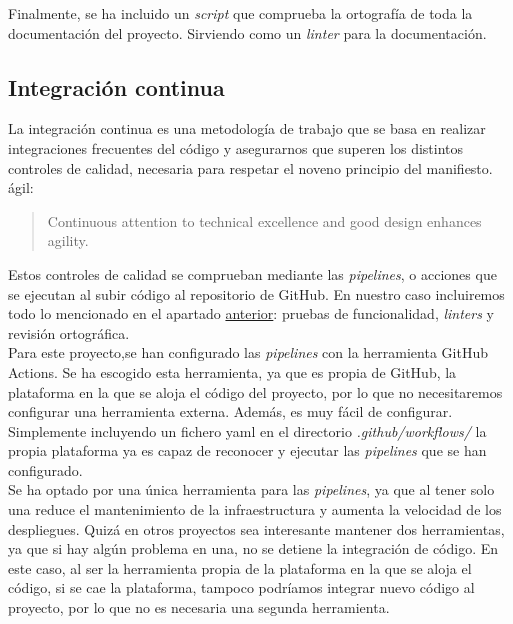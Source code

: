 Finalmente, se ha incluido un \textit{script} que comprueba la ortografía de toda la documentación del proyecto.
Sirviendo como un \textit{linter} para la documentación.\\

\subsection{Integración continua}

La integración continua es una metodología de trabajo que se basa en realizar integraciones frecuentes del código y
asegurarnos que superen los distintos controles de calidad, necesaria para respetar el noveno principio del manifiesto.
ágil:
\begin{quote}
    Continuous attention to technical excellence and good design enhances agility.
\end{quote}


Estos controles de calidad se comprueban mediante las \textit{pipelines}, o acciones que se ejecutan al subir código
al repositorio de GitHub. En nuestro caso incluiremos todo lo mencionado en el apartado
\hyperref[sec:control_de_calidad]{anterior}: pruebas de funcionalidad, \textit{linters} y revisión ortográfica.\\

Para este proyecto,se han configurado las \textit{pipelines} con la herramienta GitHub Actions. Se ha escogido esta
herramienta, ya que es propia de GitHub, la plataforma en la que se aloja el código del proyecto, por lo que no
necesitaremos configurar una herramienta externa. Además, es muy fácil de configurar. Simplemente incluyendo un fichero
yaml en el directorio \textit{.github/workflows/} la propia plataforma ya es capaz de reconocer y ejecutar las
\textit{pipelines} que se han configurado.\\

Se ha optado por una única herramienta para las \textit{pipelines}, ya que al tener solo una reduce el mantenimiento de
la infraestructura y aumenta la velocidad de los despliegues. Quizá en otros proyectos sea interesante mantener dos
herramientas, ya que si hay algún problema en una, no se detiene la integración de código. En este caso, al ser la
herramienta propia de la plataforma en la que se aloja el código, si se cae la plataforma, tampoco podríamos integrar
nuevo código al proyecto, por lo que no es necesaria una segunda herramienta.

